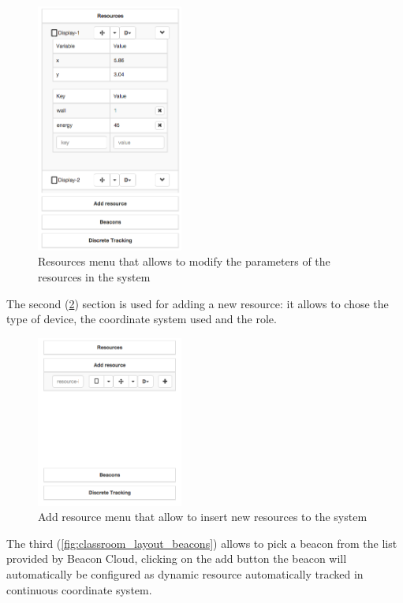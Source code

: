 \begin{figure}
\centering
\includegraphics[width=1.9in]{images/classroom-layout-resources.png}
\caption{Resources menu that allows to modify the parameters of the resources in the system}
\label{fig:classroom_layout_resources}
\end{figure}

The second (\ref{fig:classroom_layout_add}) section is used for adding a new resource: it allows to chose the type of device, the coordinate system used and the role. 

\begin{figure}
\centering
\includegraphics[width=1.9in]{images/classroom-layout-add-resource.png}
\caption{Add resource menu that allow to insert new resources to the system}
\label{fig:classroom_layout_add}
\end{figure}

The third (\ref{fig:classroom_layout_beacons}) allows to pick a beacon from the list provided by Beacon Cloud, clicking on the add button the beacon will automatically be configured as dynamic resource automatically tracked in continuous coordinate system.

